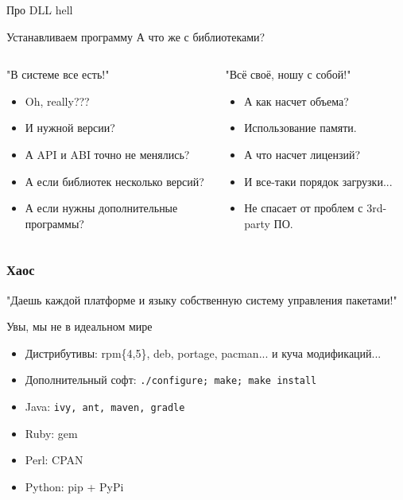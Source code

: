 \begin{frame}{Про DLL hell}

    \begin{block}{Устанавливаем программу}
	А что же с библиотеками?
	\end{block}

	\pause

   \begin{columns}
		\begin{block}{"В системе все есть!"}
		\begin{itemize}
			\item Oh, really???
			\item И нужной версии?
			\item А API и ABI точно не менялись?
			\item А если библиотек несколько версий?
			\item А если нужны дополнительные программы?
		\end{itemize}
		\end{block}
		\pause
		\begin{block}{"Всё своё, ношу с собой!"}
		\begin{itemize}
			\item А как насчет объема?
			\item Использование памяти.
			\item А что насчет лицензий?
			\item И все-таки порядок загрузки...
			\item Не спасает от проблем с 3rd-party ПО.
		\end{itemize}
		\end{block}
	\end{columns}
\end{frame}

\begin{frame}
	\frametitle{Хаос}

	\begin{center}
		"Даешь каждой платформе и языку собственную систему управления пакетами!"
	\end{center}

	\begin{block}{Увы, мы не в идеальном мире}
		\begin{itemize}
			\item Дистрибутивы: rpm\{4,5\}, deb, portage, pacman... и куча модификаций...
			\item Дополнительный софт: {\tt ./configure; make; make install}
			\item Java: {\tt ivy, ant, maven, gradle}
			\item Ruby: gem
			\item Perl: CPAN
			\item Python: pip + PyPi
		\end{itemize}
	\end{block}

\end{frame}



